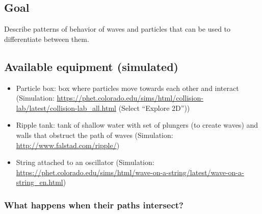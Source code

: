 \subsection{Goal}

Describe patterns of behavior of waves and particles that can be used to differentiate between them.




\subsection{Available equipment (simulated)}

\begin{itemize}
	\item Particle box: box where particles move towards each other and interact (Simulation:  \url{https://phet.colorado.edu/sims/html/collision-lab/latest/collision-lab_all.html} (Select ``Explore 2D''))

	\item Ripple tank: tank of shallow water with set of plungers (to create waves) and walls that obstruct the path of waves (Simulation: \url{http://www.falstad.com/ripple/})
	
	\item String attached to an oscillator (Simulation: \url{https://phet.colorado.edu/sims/html/wave-on-a-string/latest/wave-on-a-string_en.html})
\end{itemize}

\subsubsection{What happens when their paths intersect?}


